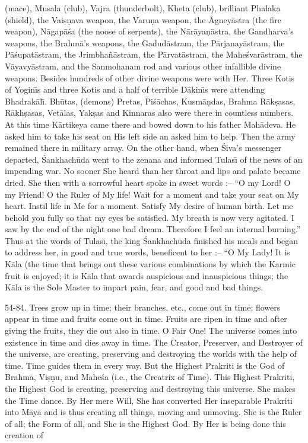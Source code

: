 (mace), Musala (club), Vajra (thunderbolt), Kheta (club), brilliant Phalaka (shield), the Vai\d{s}\d{n}ava weapon, the Varu\d{n}a weapon, the \=Agney\=astra (the fire weapon), N\=agap\=a\'sa (the noose of serpents), the N\=ar\=aya\d{n}\=astra, the Gandharva's weapons, the Brahm\=a's weapons, the Gadud\=astram, the P\=arjanay\=astram, the P\=a\'supat\=astram, the Jrimbha\~n\=astram, the P\=arvat\=astram, the Mahe\'svar\=astram, the V\=ayavy\=astram, and the Sanmohanam rod and various other infallible divine weapons. Besides hundreds of other divine weapons were with Her. Three Kotis of Yogin\={\i}s and three Kotis and a half of terrible D\=akin\={\i}s were attending Bhadrak\=al\={\i}. Bh\=utas, (demons) Pretas, Pi\'s\=achas, Kusm\=a\d{n}das, Brahma R\=ak\d{s}asas, R\=akh\d{s}asas, Vet\=alas, Yak\d{s}as and Kinnaras also were there in countless numbers. At this time K\=artikeya came there and bowed down to his father Mah\=adeva. He asked him to take his seat on His left side an asked him to help. Then the army remained there in military array. On the other hand, when \'Siva's messenger departed, \'Sankhach\=uda went to the zenana and informed Tulas\={\i} of the news of an impending war. No sooner She heard than her throat and lips and palate became dried. She then with a sorrowful heart spoke in sweet words :-- ``O my Lord! O my Friend! O the Ruler of My life! Wait for a moment and take your seat on My heart. Instil life in Me for a moment. Satisfy My desire of human birth. Let me behold you fully so that my eyes be satisfled. My breath is now very agitated. I saw by the end of the night one bad dream. Therefore I feel an internal burning.'' Thus at the words of Tulas\={\i}, the king \'Sankhach\=uda finished his meals and began to address her, in good and true words, beneficent to her :-- ``O My Lady! It is K\=ala (the time that brings out these various combinations by which the Karmic fruit is enjoyed; it is K\=ala that awards auspicious and inauspicious things; the K\=ala is the Sole Master to impart pain, fear, and good and bad things.

54-84. Trees grow up in time; their branches, etc., come out in time; flowers appear in time and fruits come out in time. Fruits are ripen in time and after giving the fruits, they die out also in time. O Fair One! The universe comes into existence in time and dies away in time. The Creator, Preserver, and Destroyer of the universe, are creating, preserving and destroying the worlds with the help of time. Time guides them in every way. But the Highest Prakriti is the God of Brahm\=a, Vi\d{s}\d{n}u, and Mahe\'sa (i.e., the Creatrix of Time). This Highest Prakriti, the Highest God is creating, preserving and destroying this universe. She makes the Time dance. By Her mere Will, She has converted Her inseparable Prakriti into M\=ay\=a and is thus creating all things, moving and unmoving. She is the Ruler of all; the Form of all, and She is the Highest God. By Her is being done this creation of

